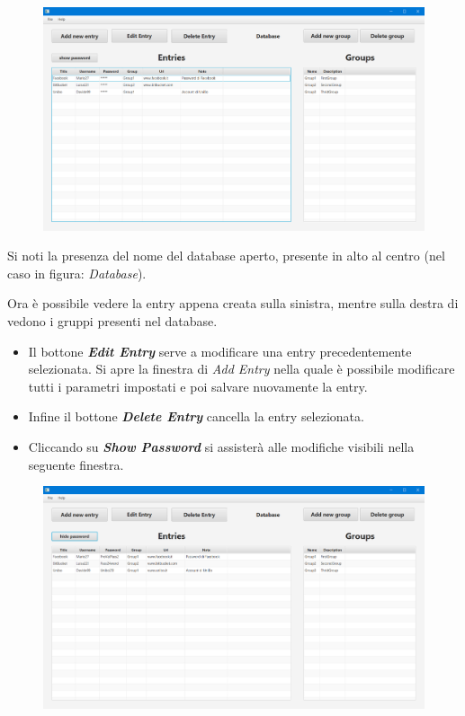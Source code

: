 \documentclass[a4paper,12pt]{report}
\begin{document}
\clearpage
\begin{figure}[h]
\centering{}
\includegraphics[width=\textwidth]{user-manual/9}
\end{figure}

Si noti la presenza del nome del database aperto, presente in alto al centro (nel caso in figura: \textit{Database}).

Ora è possibile vedere la entry appena creata sulla sinistra, mentre sulla destra di vedono i gruppi presenti nel database.

\begin{itemize}
    \item Il bottone \textbf{\textit{Edit Entry}} serve a modificare una entry precedentemente selezionata. Si apre la finestra di \textit{Add Entry} nella quale è possibile modificare tutti i parametri impostati e poi salvare nuovamente la entry.
    \item Infine il bottone \textbf{\textit{Delete Entry}} cancella la entry selezionata.
    \item Cliccando su \textbf{\textit{Show Password}} si assisterà alle modifiche visibili nella seguente finestra.
\end{itemize}

\clearpage
\begin{figure}[h]
\centering{}
\includegraphics[width=\textwidth]{user-manual/10}
\end{figure}
\end{document}

